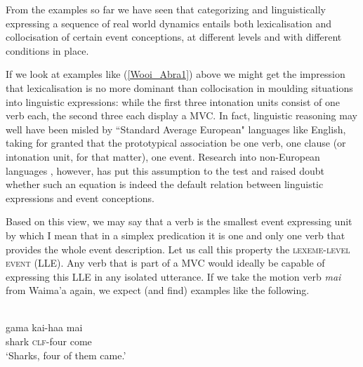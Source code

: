 From the examples so far we have seen that categorizing and linguistically expressing a sequence of real world dynamics entails both lexicalisation and collocisation of certain event conceptions, at different levels and with different conditions in place. 

If we look at examples like (\ref{Wooi_Abra1}) above we might get the impression that lexicalisation is no more dominant than collocisation in moulding situations into linguistic expressions: while the first three intonation units consist of one verb each, the second three each display a MVC. In fact, linguistic reasoning may well have been misled by ``Standard Average European" languages like English, taking for granted that the prototypical association be one verb, one clause (or intonation unit, for that matter), one event. Research into non-European languages \citep{Pawley1987, pawley2011event, baker2010complex, foley2010events, bohnemeyer2007principles}, however, has put this assumption to the test and raised doubt whether such an equation is indeed the default relation between linguistic expressions and event conceptions.

Based on this view, we may say that a verb is the smallest event expressing unit by which I mean that in a simplex predication it is one and only one verb that provides the whole event description. Let us call this property the \textsc{lexeme-level event} (LLE). Any verb that is part of a MVC would ideally be capable of expressing this LLE in any isolated utterance. If we take the motion verb \textit{mai} from Waima'a again, we expect (and find) examples like the following.

\ea \label{WMH_Julio_goat309}
\\
\gll gama kai-haa mai \\
shark \textsc{clf}-four come \\
\glft `Sharks, four of them came.' \\ 
\z

